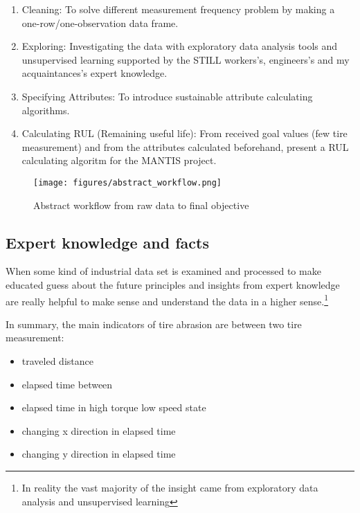 \begin{enumerate}
	\item {Cleaning:} To solve different measurement frequency problem by making a one-row/one-observation data frame.
	\item {Exploring:} Investigating the data with exploratory data analysis tools and unsupervised learning supported by the STILL workers's, engineers's and my acquaintances's expert knowledge.
 	\item {Specifying Attributes:} To introduce sustainable attribute calculating algorithms.
 	\item {Calculating RUL (Remaining useful life):} From received goal values (few tire measurement) and from the attributes calculated beforehand, present a RUL calculating algoritm for the MANTIS project.
\end{enumerate}

\begin{figure}[!ht]
\centering
\texttt{[image: figures/abstract\_workflow.png]}
\caption{Abstract workflow from raw data to final objective} 
\end{figure}

\subsection{Expert knowledge and facts}
\noindent
When some kind of industrial data set is examined and processed to make educated guess about the future principles and insights from expert knowledge are really helpful to make sense and understand the data in a higher sense.\footnote{In reality the vast majority of the insight came from exploratory data analysis and unsupervised learning}

\noindent
In summary, the main indicators of tire abrasion are between two tire measurement:
\begin{itemize}
	\item{traveled distance} 
	\item{elapsed time between}
	\item{elapsed time in high torque low speed state}
	\item{changing x direction in elapsed time}
	\item{changing y direction in elapsed time}
\end{itemize}

